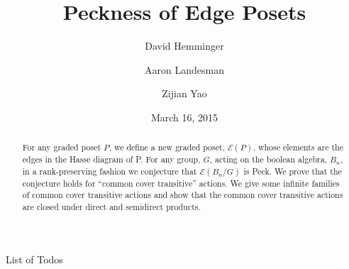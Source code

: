 \documentclass[smallextended, envcountsame, numbook]{svjour3}
\makeatletter
\numberwithin{equation}{section}
\def\listtodoname{List of Todos}
\def\listoftodos{\@starttoc{tdo}\listtodoname}
\makeatother
\begin{document}
\title{Peckness of Edge Posets}

\author{David Hemminger      \and
        Aaron Landesman 		 \and
        Zijian Yao
}


\date{March 16, 2015}


\maketitle



\begin{abstract}
For any graded poset $P$, we define a new graded poset, $\mathcal E(P)$, whose elements are the edges in the Hasse diagram of P. For any group, $G$, acting on the boolean algebra, $B_n$, in a rank-preserving fashion we conjecture that $\mathcal E(B_n/G)$ is Peck. We prove that the conjecture holds for ``common cover transitive'' actions. We give some infinite families of common cover transitive actions and show that the common cover transitive actions are closed under direct and semidirect products.

\end{abstract}
\listoftodos

\newpage
\end{document}
